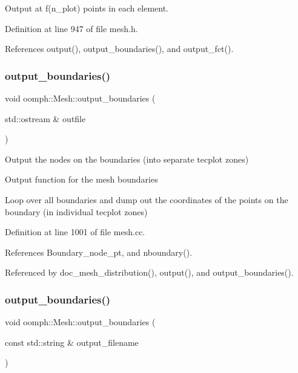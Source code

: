 Output at f(n\+\_\+plot) points in each element. 



Definition at line 947 of file mesh.\+h.



References output(), output\+\_\+boundaries(), and output\+\_\+fct().

\mbox{\label{classoomph_1_1Mesh_af6effab50e32290d4d8066440b9b3e37}} 
\subsubsection{\texorpdfstring{output\+\_\+boundaries()}{output\_boundaries()}\hspace{0.1cm}{\footnotesize\ttfamily [1/2]}}
{\footnotesize\ttfamily void oomph\+::\+Mesh\+::output\+\_\+boundaries (\begin{DoxyParamCaption}\item[{std\+::ostream \&}]{outfile }\end{DoxyParamCaption})}



Output the nodes on the boundaries (into separate tecplot zones) 

Output function for the mesh boundaries

Loop over all boundaries and dump out the coordinates of the points on the boundary (in individual tecplot zones) 

Definition at line 1001 of file mesh.\+cc.



References Boundary\+\_\+node\+\_\+pt, and nboundary().



Referenced by doc\+\_\+mesh\+\_\+distribution(), output(), and output\+\_\+boundaries().

\mbox{\label{classoomph_1_1Mesh_a82c291df31d4b6400004ede7c0973106}} 
\subsubsection{\texorpdfstring{output\+\_\+boundaries()}{output\_boundaries()}\hspace{0.1cm}{\footnotesize\ttfamily [2/2]}}
{\footnotesize\ttfamily void oomph\+::\+Mesh\+::output\+\_\+boundaries (\begin{DoxyParamCaption}\item[{const std\+::string \&}]{output\+\_\+filename }\end{DoxyParamCaption})\hspace{0.3cm}{\ttfamily [inline]}}

